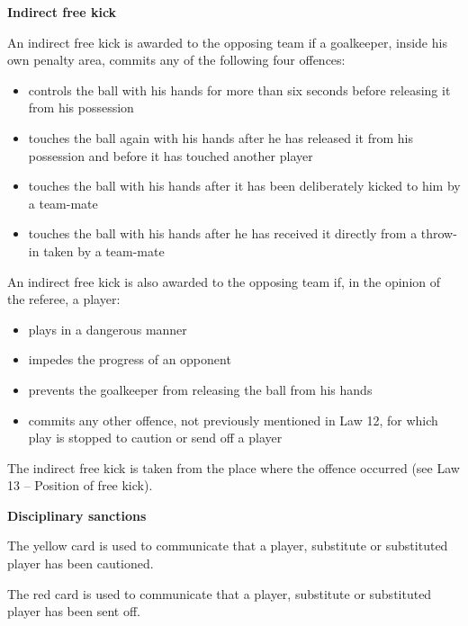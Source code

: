 \bigskip

{\color{magenta}
{\bfseries Indirect free kick}

\headlinebox

An indirect free kick is awarded to the opposing team if a goalkeeper, inside his own penalty area, commits any of the following four offences: 

\begin{itemize}
\item controls the ball with his hands for more than six seconds before releasing it from his possession
\item touches the ball again with his hands after he has released it from his possession and before it has touched another player
\item touches the ball with his hands after it has been deliberately kicked to him by a team-mate
\item touches the ball with his hands after he has received it directly from a throw-in taken by a team-mate
\end{itemize}

\bigskip

An indirect free kick is also awarded to the opposing team if, in the opinion of the referee, a player:

\begin{itemize}
\item plays in a dangerous manner
\item impedes the progress of an opponent
\item prevents the goalkeeper from releasing the ball from his hands
\item commits any other offence, not previously mentioned in Law 12, for which play is stopped to caution or send off a player
\end{itemize}

\bigskip

The indirect free kick is taken from the place where the offence occurred (see Law 13 -- Position of free kick).

\bigskip

{\bfseries Disciplinary sanctions}

\headlinebox

The yellow card is used to communicate that a player, substitute or substituted player has been cautioned.

\bigskip

The red card is used to communicate that a player, substitute or substituted player has been sent off.

}
